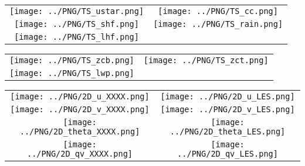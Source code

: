 \documentclass{article}
\begin{document}

\begin{table}
  \begin{tabular}{cc}
    \texttt{[image: ../PNG/TS\_ustar.png]} & \texttt{[image: ../PNG/TS\_cc.png]}   \\ 
    \texttt{[image: ../PNG/TS\_shf.png]}   & \texttt{[image: ../PNG/TS\_rain.png]}  \\
    \texttt{[image: ../PNG/TS\_lhf.png]}   & 
  \end{tabular}
\end{table}

\newpage

\begin{table}
  \begin{tabular}{cc}
    \texttt{[image: ../PNG/TS\_zcb.png]} &  \texttt{[image: ../PNG/TS\_zct.png]} \\
    \texttt{[image: ../PNG/TS\_lwp.png]} &  %
  \end{tabular}
\end{table}

\newpage



\begin{table}
  \begin{tabular}{cc}
     \texttt{[image: ../PNG/2D\_u\_XXXX.png]}     & \texttt{[image: ../PNG/2D\_u\_LES.png]}     \\
     \texttt{[image: ../PNG/2D\_v\_XXXX.png]}     & \texttt{[image: ../PNG/2D\_v\_LES.png]}     \\
     \texttt{[image: ../PNG/2D\_theta\_XXXX.png]} & \texttt{[image: ../PNG/2D\_theta\_LES.png]} \\
     \texttt{[image: ../PNG/2D\_qv\_XXXX.png]}    & \texttt{[image: ../PNG/2D\_qv\_LES.png]}
  \end{tabular}
\end{table}
\end{document}
